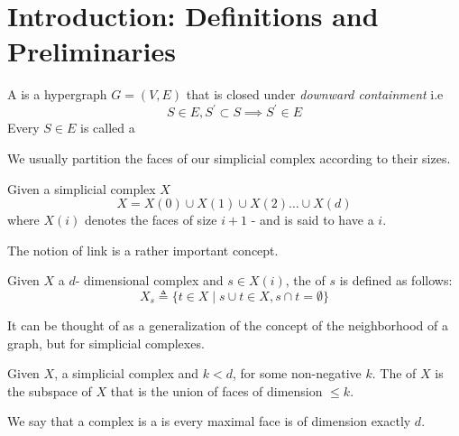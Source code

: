 \section{Introduction: Definitions and Preliminaries}

\begin{definition}\label{def:simplicial-complex}
    A  is a hypergraph \(G = (V,E)\) that is closed under \textit{downward containment} i.e 
    \begin{equation}
        S \in E, S^{\prime} \subset S \implies S^{\prime} \in E 
    \end{equation} 
    Every \(S \in E\) is called a 
\end{definition}

We usually partition the faces of our simplicial complex according to their sizes. 

\begin{definition}
    Given a simplicial complex \(X\)
    \begin{equation}
        X = X(0) \cup X(1) \cup X(2) \dots \cup X(d)
    \end{equation} 
    where \(X(i)\) denotes the faces of size \(i+1\) - and is said to have a  \(i\).    
\end{definition}

The notion of link is a rather important concept. 

\begin{definition}
    Given \(X\) a \(d\)- dimensional complex and \(s \in X(i)\), the  of \(s\) is 
    defined as follows: 
    \begin{equation}
        X_s \triangleq \{ t \in X \mid s \cup t \in X, s \cap t = \emptyset \} 
    \end{equation}   
\end{definition}

It can be thought of as a generalization of the concept of the neighborhood of a graph, but for simplicial complexes. 

\begin{definition}
    Given \(X\), a simplicial complex and \(k < d\), for some non-negative \(k\). The  of \(X\) 
    is the subspace of \(X\) that is the union of faces of dimension \(\leqslant k\).  
\end{definition}

\begin{definition}
    We say that a complex is a  is every 
    maximal face is of dimension exactly \(d\). 
\end{definition}

